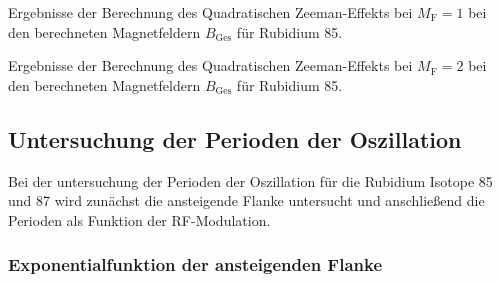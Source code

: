 \begin{table}[!h]
    \centering
    \caption{Ergebnisse der Berechnung des Quadratischen Zeeman-Effekts bei $M_\text{F} = 1$ bei den berechneten Magnetfeldern $B_\text{Ges}$ für Rubidium 85.}
    
    \label{tab:square_85_3}
\end{table}

\begin{table}[!h]
    \centering
    \caption{Ergebnisse der Berechnung des Quadratischen Zeeman-Effekts bei $M_\text{F} = 2$ bei den berechneten Magnetfeldern $B_\text{Ges}$ für Rubidium 85.}
    
    \label{tab:square_85_4}
\end{table}

\FloatBarrier
\subsection{Untersuchung der Perioden der Oszillation} %
\label{sub:subsection_name}

Bei der untersuchung der Perioden der Oszillation für die Rubidium Isotope 85 und 87 wird zunächst die ansteigende Flanke untersucht und anschließend die Perioden als Funktion der RF-Modulation.

\subsubsection{Exponentialfunktion der ansteigenden Flanke} %
\label{ssub:exponentialfunktion_der_ansteigenden_flanke}

